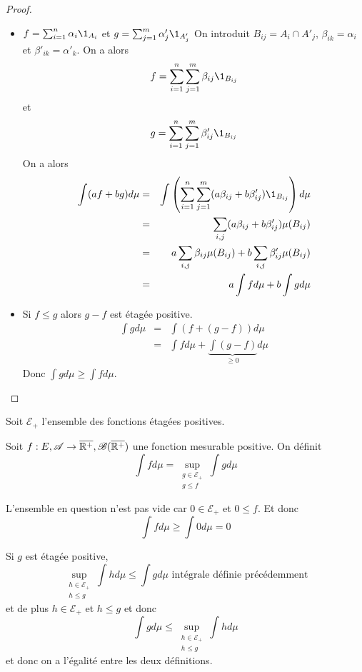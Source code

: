 \begin{proof}
	\begin{itemize}
		\item $ f = \sum_{i=1}^n \alpha_i \1_{A_i} $ et $ g = \sum_{j=1}^m \alpha'_j \1_{A'_j} $
		      On introduit $B_{ij} = A_i \cap A'_j$, $\beta_{ik} = \alpha_i$ et $\beta'_{ik} = \alpha'_k$.
		      On a alors
		      $$ f = \sum_{i=1}^n \sum_{j=1}^m \beta_{ij} \1_{B_{ij}} $$ %
		      et
		      $$ g = \sum_{i=1}^n \sum_{j=1}^m \beta'_{ij} \1_{B_{ij}} $$ %
		      On a alors
		      \begin{eqnarray*}
			      \int (af + bg) d\mu & = & \int \left( \sum_{i=1}^n \sum_{j=1}^m (a\beta_{ij} + b\beta'_{ij}) \1_{B_{ij}} \right) d\mu \\
			      & = & \sum_{i,j} (a\beta_{ij} + b\beta'_{ij}) \mu(B_{ij}) \\
			      & = & a \sum_{i,j} \beta_{ij} \mu(B_{ij}) + b \sum_{i,j} \beta'_{ij} \mu(B_{ij}) \\
			      & = & a \int f d\mu + b \int g d\mu
		      \end{eqnarray*}
		\item Si $f \leq g$ alors $g - f $ est étagée positive.
		      \begin{eqnarray*}
			      \int g d\mu & = & \int (f + (g-f)) d\mu \\
			      & = & \int f d\mu + \underbrace{\int (g-f)}_{\geq 0} d\mu
		      \end{eqnarray*}
		      Donc $\int g d\mu \geq \int f d\mu$.
	\end{itemize}
\end{proof}

Soit  $\mathcal{E}_+$ l'ensemble des fonctions étagées positives.


\begin{definition}
	Soit $f: E, \mathscr{A} \to \overline{\mathbb{R}^+}, \mathscr{B}(\overline{\mathbb{R}^+})$ une fonction mesurable positive.
	On définit
	$$ \int f d\mu = \sup\limits_{\substack{g \in \mathcal{E}_+ \\ g \leq f}} \int g d\mu $$
\end{definition}

\begin{remarque}
	L'ensemble en question n'est pas vide car $0 \in \mathcal{E}_+$ et $0 \leq f$. Et donc
	$$ \int f d\mu \geq \int 0 d\mu = 0 $$
\end{remarque}

\begin{remarque}
	Si $g$ est étagée positive,
	$$\sup\limits_{\substack{h \in \mathcal{E}_+ \\ h \leq g}} \int h d\mu \leq \int g d\mu \text{ intégrale définie précédemment}$$
	et de plus $h \in \mathcal{E}_+$ et $h \leq g$ et donc
	$$ \int g d\mu \leq \sup\limits_{\substack{h \in \mathcal{E}_+ \\ h \leq g}} \int h d\mu $$
	et donc on a l'égalité entre les deux définitions.
\end{remarque}

